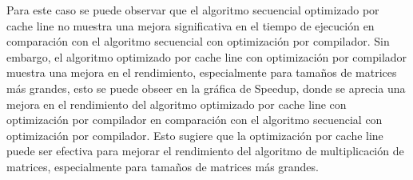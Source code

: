 Para este caso se puede observar que el algoritmo secuencial optimizado por cache line no muestra una mejora significativa en el tiempo de ejecución en comparación con el algoritmo secuencial con optimización por compilador. Sin embargo, el algoritmo optimizado por cache line con optimización por compilador muestra una mejora en el rendimiento, especialmente para tamaños de matrices más grandes, esto se puede obseer en la gráfica de Speedup, donde se aprecia una mejora en el rendimiento del algoritmo optimizado por cache line con optimización por compilador en comparación con el algoritmo secuencial con optimización por compilador. Esto sugiere que la optimización por cache line puede ser efectiva para mejorar el rendimiento del algoritmo de multiplicación de matrices, especialmente para tamaños de matrices más grandes.